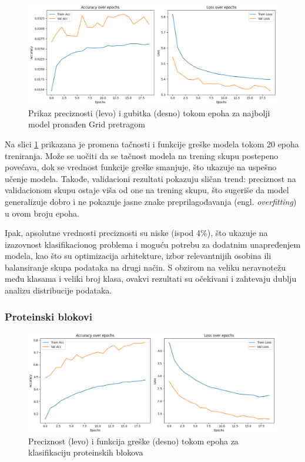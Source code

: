 \documentclass[a4paper,12pt]{article}
\begin{document}
\begin{figure}[htbp]
    \centering
    \includegraphics[width=1\textwidth]{images/epochs_aa.png}
    \caption{Prikaz preciznosti (levo) i gubitka (desno) tokom epoha za najbolji model pronađen Grid pretragom}
    \label{fig:accuracy_loss}
\end{figure}

Na slici \ref{fig:accuracy_loss} prikazana je promena tačnosti i funkcije greške modela tokom 20 epoha treniranja. Može se uočiti da se tačnost modela na trening skupu postepeno povećava, dok se vrednost funkcije greške smanjuje, što ukazuje na uspešno učenje modela. Takođe, validacioni rezultati pokazuju sličan trend: preciznost na validacionom skupu ostaje viša od one na trening skupu, što sugeriše da model generalizuje dobro i ne pokazuje jasne znake preprilagođavanja (engl. \textit{overfitting}) u ovom broju epoha.

Ipak, apsolutne vrednosti preciznosti su niske (ispod 4\%), što ukazuje na izazovnost klasifikacionog problema i moguću potrebu za dodatnim unapređenjem modela, kao što su optimizacija arhitekture, izbor relevantnijih osobina ili balansiranje skupa podataka na drugi način. S obzirom na veliku neravnotežu među klasama i veliki broj klasa, ovakvi rezultati su očekivani i zahtevaju dublju analizu distribucije podataka.

\subsubsection*{Proteinski blokovi}

\begin{figure}[htbp]
    \centering
    \includegraphics[width=1\textwidth]{images/epochs_pb.png}
    \caption{Preciznost (levo) i funkcija greške (desno) tokom epoha za klasifikaciju proteinskih blokova}
    \label{fig:pb_accuracy_loss}
\end{figure}
\end{document}
